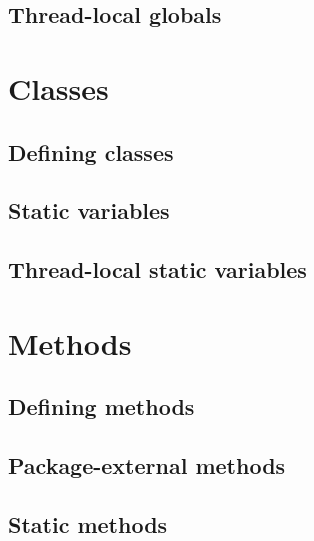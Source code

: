 \documentclass{article}
\begin{document}
\subsection{Thread-local globals}
\label{sub:globals:threadlocal}

\section{Classes}
\label{sec:classes}

\subsection{Defining classes}
\label{sub:classes:definition}

\subsection{Static variables}
\label{sub:classes:static}

\subsection{Thread-local static variables}
\label{sub:classes:threadlocal}

\section{Methods}
\label{sec:methods}

\subsection{Defining methods}
\label{sub:methods:definition}

\subsection{Package-external methods}
\label{sub:methods:extern}

\subsection{Static methods}
\label{sub:methods:static}
\end{document}
